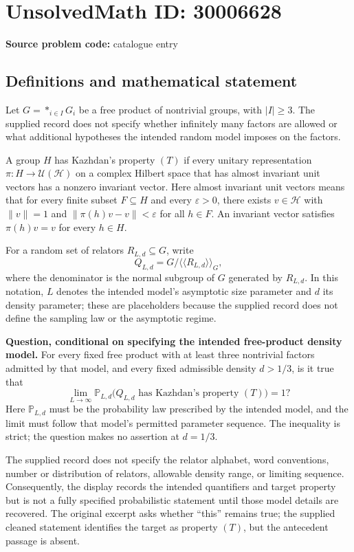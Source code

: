 \documentclass[11pt]{article}
\begin{document}
\section*{UnsolvedMath ID: 30006628}
\textbf{Source problem code:} catalogue entry
\subsection{Definitions and mathematical statement}
Let \(G=\mathop{\ast}_{i\in I}G_i\) be a free product of nontrivial groups, with \(|I|\geq 3\). The supplied record does not specify whether infinitely many factors are allowed or what additional hypotheses the intended random model imposes on the factors.

A group \(H\) has Kazhdan's property \((T)\) if every unitary representation \(\pi:H\to\mathcal U(\mathcal H)\) on a complex Hilbert space that has almost invariant unit vectors has a nonzero invariant vector. Here almost invariant unit vectors means that for every finite subset \(F\subseteq H\) and every \(\varepsilon>0\), there exists \(v\in\mathcal H\) with \(\|v\|=1\) and \(\|\pi(h)v-v\|<\varepsilon\) for all \(h\in F\). An invariant vector satisfies \(\pi(h)v=v\) for every \(h\in H\).

For a random set of relators \(R_{L,d}\subseteq G\), write
\[
Q_{L,d}=G/\langle\!\langle R_{L,d}\rangle\!\rangle_G,
\]
where the denominator is the normal subgroup of \(G\) generated by \(R_{L,d}\). In this notation, \(L\) denotes the intended model's asymptotic size parameter and \(d\) its density parameter; these are placeholders because the supplied record does not define the sampling law or the asymptotic regime.

\textbf{Question, conditional on specifying the intended free-product density model.} For every fixed free product with at least three nontrivial factors admitted by that model, and every fixed admissible density \(d>1/3\), is it true that
\[
\lim_{L\to\infty}\mathbb P_{L,d}\bigl(Q_{L,d}\text{ has Kazhdan's property }(T)\bigr)=1?
\]
Here \(\mathbb P_{L,d}\) must be the probability law prescribed by the intended model, and the limit must follow that model's permitted parameter sequence. The inequality is strict; the question makes no assertion at \(d=1/3\).

The supplied record does not specify the relator alphabet, word conventions, number or distribution of relators, allowable density range, or limiting sequence. Consequently, the display records the intended quantifiers and target property but is not a fully specified probabilistic statement until those model details are recovered. The original excerpt asks whether ``this'' remains true; the supplied cleaned statement identifies the target as property \((T)\), but the antecedent passage is absent.
\end{document}
